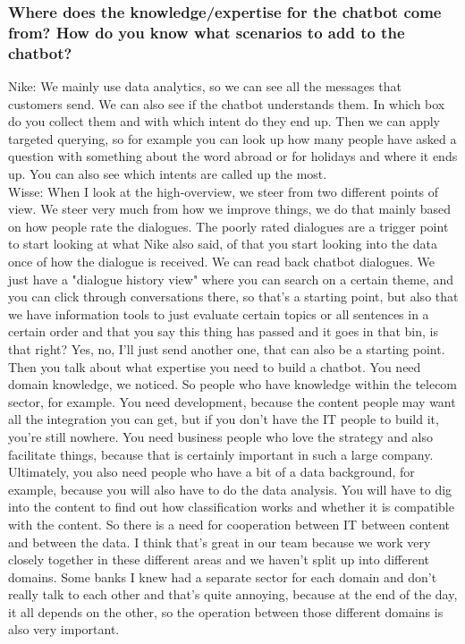 \begin{appendices}
	\subsubsection{Where does the knowledge/expertise for the chatbot come from? How do
		you know what scenarios to add to the chatbot?}
	Nike: We mainly use data analytics, so we can see all the messages that customers send. We can also see if the chatbot understands them. In which box do you collect them and with which intent do they end up. Then we can apply targeted querying, so for example you can look up how many people have asked a question with something about the word abroad or for holidays and where it ends up. You can also see which intents are called up the most.\\
	\break
	Wisse: When I look at the high-overview, we steer from two different points of view. We steer very much from how we improve things, we do that mainly based on how people rate the dialogues. The poorly rated dialogues are a trigger point to start looking at what Nike also said, of that you start looking into the data once of how the dialogue is received. We can read back chatbot dialogues. We just have a "dialogue history view" where you can search on a certain theme, and you can click through conversations there, so that's a starting point, but also that we have information tools to just evaluate certain topics or all sentences in a certain order and that you say this thing has passed and it goes in that bin, is that right? Yes, no, I'll just send another one, that can also be a starting point. Then you talk about what expertise you need to build a chatbot.  You need domain knowledge, we noticed. So people who have knowledge within the telecom sector, for example. You need development, because the content people may want all the integration you can get, but if you don't have the IT people to build it, you're still nowhere. You need business people who love the strategy and also facilitate things, because that is certainly important in such a large company. Ultimately, you also need people who have a bit of a data background, for example, because you will also have to do the data analysis. You will have to dig into the content to find out how classification works and whether it is compatible with the content. So there is a need for cooperation between IT between content and between the data. I think that's great in our team because we work very closely together in these different areas and we haven't split up into different domains. Some banks I knew had a separate sector for each domain and don't really talk to each other and that's quite annoying, because at the end of the day, it all depends on the other, so the operation between those different domains is also very important.
	

\end{appendices}
